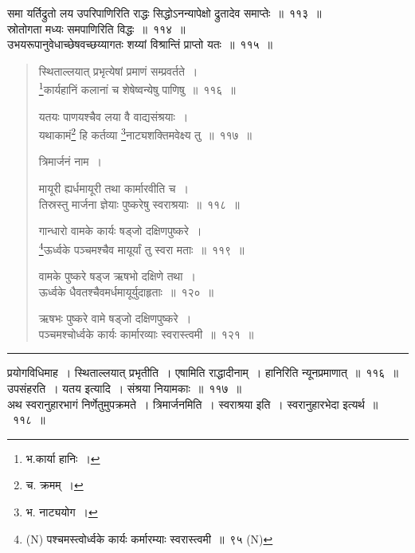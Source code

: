 \documentclass[11pt, openany]{book}
\begin{document}
समा यर्तिद्रुतो लय उपरिपाणिरिति राद्धः सिद्धोऽनन्यापेक्षो द्रुतादेव समाप्तेः~॥~११३~॥\\

स्रोतोगता मध्यः समपाणिरिति विद्धः~॥~११४~॥\\

उभयरूपानुवेधाच्छेषवच्छय्यागतः शय्यां विश्रान्तिं प्राप्तो यतः~॥~११५~॥

\newpage

\begin{quote}
{\na स्थिताल्लयात् प्रभृत्येषां प्रमाणं सम्प्रवर्तते~।\\
\renewcommand{\thefootnote}{1}\footnote{भ.कार्या हानिः~।}कार्यहानिं कलानां च शेषेष्वन्येषु पाणिषु~॥~११६~॥

यतयः पाणयश्चैव लया वै वाद्यसंश्रयाः~।\\
यथाकामं\renewcommand{\thefootnote}{2}\footnote{च. क्रमम्~।} हि कर्तव्या \renewcommand{\thefootnote}{3}\footnote{भ. नाट्ययोग~।}नाट्यशक्तिमवेक्ष्य तु~॥~११७~॥}

त्रिमार्जनं नाम~। 

{\na मायूरी ह्यर्धमायूरी तथा कार्मारवीति च~।\\
तिस्रस्तु मार्जना ज्ञेयाः पुष्करेषु स्वराश्रयाः~॥~११८~॥

गान्धारो वामके कार्यः षड्जो दक्षिणपुष्करे~।\\
\renewcommand{\thefootnote}{4}\footnote{(N) पश्चमस्त्वोर्ध्वके कार्यः कर्मारम्याः स्वरास्त्वमी~॥~९५ (N)}ऊर्ध्वके पञ्चमश्चैव मायूर्यां तु स्वरा मताः~॥~११९~॥

वामके पुष्करे षड्ज ऋषभो दक्षिणे तथा~।\\
ऊर्ध्वके धैवतश्चैवमर्धमायूर्युदाहृताः~॥~१२०~॥

ऋषभः पुष्करे वामे षड्जो दक्षिणपुष्करे~।\\
पञ्चमश्चोर्ध्वके कार्यः कार्मारव्याः स्वरास्त्वमी~॥~१२१~॥}
\end{quote}

\hrule

\vspace{2mm}
\noindent
{\qtt प्रयोगविधिमाह}~। स्थिताल्लयात् प्रभृतीति~। एषामिति राद्धादीनाम्~। हानिरिति न्यूनप्रमाणात्~॥~११६~॥\\

{\qtt उपसंहरति}~। यतय इत्यादि~। संश्रया नियामकाः~॥~११७~॥\\

अथ स्वरानुहारभागं निर्णेतुमुपक्रमते~। {\qtt त्रिमार्जनमिति}~। स्वराश्रया इति~। स्वरानुहारभेदा इत्यर्थ~॥~११८~॥\\
\end{document}
